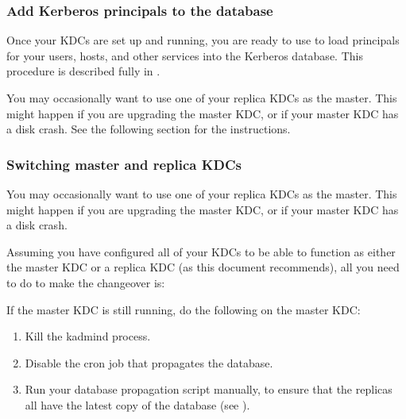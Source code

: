 \documentclass[letterpaper,10pt,english]{sphinxmanual}
\begin{document}
\subsubsection{Add Kerberos principals to the database}
\label{\detokenize{admin/install_kdc:add-kerberos-principals-to-the-database}}
Once your KDCs are set up and running, you are ready to use
{\hyperref[\detokenize{admin/admin_commands/kadmin_local:kadmin-1}]{}} to load principals for your users, hosts, and other
services into the Kerberos database.  This procedure is described
fully in {\hyperref[\detokenize{admin/database:add-mod-del-princs}]{}}.

You may occasionally want to use one of your replica KDCs as the
master.  This might happen if you are upgrading the master KDC, or if
your master KDC has a disk crash.  See the following section for the
instructions.


\subsubsection{Switching master and replica KDCs}
\label{\detokenize{admin/install_kdc:switch-master-replica}}\label{\detokenize{admin/install_kdc:switching-master-and-replica-kdcs}}
You may occasionally want to use one of your replica KDCs as the
master.  This might happen if you are upgrading the master KDC, or if
your master KDC has a disk crash.

Assuming you have configured all of your KDCs to be able to function
as either the master KDC or a replica KDC (as this document
recommends), all you need to do to make the changeover is:

If the master KDC is still running, do the following on the 
master KDC:
\begin{enumerate}
\item {} 
Kill the kadmind process.

\item {} 
Disable the cron job that propagates the database.

\item {} 
Run your database propagation script manually, to ensure that the
replicas all have the latest copy of the database (see
{\hyperref[\detokenize{admin/install_kdc:kprop-to-replicas}]{}}).

\end{enumerate}
\end{document}
